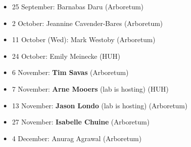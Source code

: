 \documentclass[11pt]{article}
\newenvironment{smitemize}{
\begin{itemize}
  \setlength{\itemsep}{0pt}
  \setlength{\parskip}{0.8pt}
  \setlength{\parsep}{0pt}}
{\end{itemize}
}
\begin{document}
\vspace{6pt}
\begin{smitemize}
\item 25 September: Barnabas Daru (Arboretum)
\item 2 October: Jeannine Cavender-Bares (Arboretum)
\item 11 October (Wed): Mark Westoby (Arboretum)
\item 24 October: Emily Meinecke (HUH)
\item 6 November: {\bf Tim Savas} (Arboretum)
\item 7 November: {\bf Arne Mooers} (lab is hosting) (HUH)
\item 13 November: {\bf  Jason Londo} (lab is hosting) (Arboretum)
\item 27 November: {\bf  Isabelle Chuine} (Arboretum)
\item 4 December: Anurag Agrawal (Arboretum)
\end{smitemize}
\vspace{2ex}
\end{document}
